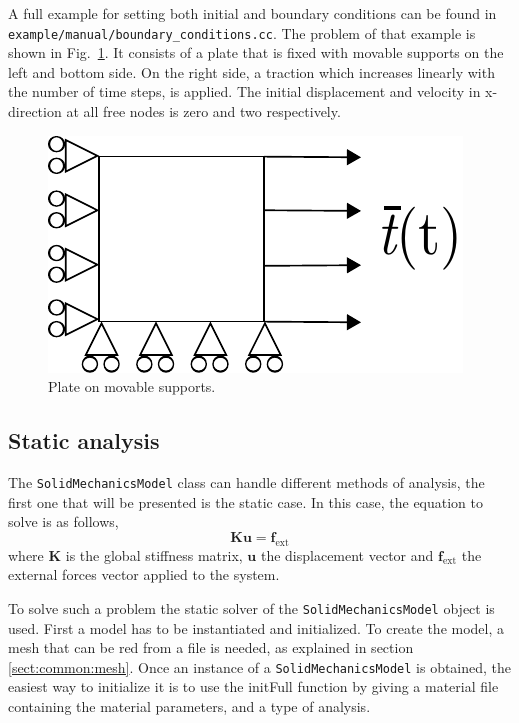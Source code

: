 \documentclass[a4paper,11pt]{book}
\newcommand{\code}[1]{\texttt{#1}}
\renewcommand{\vec}[1]{\ensuremath{\boldsymbol{#1}}}
\newcommand{\mat}[1]{\ensuremath{\boldsymbol{#1}}}
\newcommand{\st}[1]{{\mathrm{#1}}}
\begin{document}
A full example for setting both initial and boundary conditions can be found in \code{example/manual/boundary\_conditions.cc}. The problem of that example is shown in Fig.~\ref{fig:smm:bc_and_ic}. It consists of a plate that is fixed with movable supports on the left and bottom side. On the right side, a traction which increases linearly with the number of time steps, is applied. The initial displacement and velocity in x-direction at all free nodes is zero and two respectively.
\begin{figure}[!htb]
  \centering
  \includegraphics[scale=0.8]{figures/bc_and_ic_example}
  \caption{Plate on movable supports.\label{fig:smm:bc_and_ic}}
\end{figure}

\subsection{Static analysis\label{sect:smm:static}}

The \code{SolidMechanicsModel}  class can handle different  methods of analysis,
the first  one that will  be presented  is the static  case.  In this  case, the
equation to solve is as follows,
\begin{equation}\label{eqn:smm:static}
  \mat{K} \vec{u} = \vec{f_{\st{ext}}}
\end{equation}
where  $\mat{K}$ is  the  global stiffness  matrix,  $\vec{u}$ the  displacement
vector  and  $\vec{f_{\st{ext}}}$ the  external  forces  vector  applied to  the
system.


To     solve    such     a    problem     the    static     solver     of    the
\code{SolidMechanicsModel}  object is used.   First a
model has to be instantiated and  initialized.  To create the model, a mesh that
can   be   red   from   a   file   is   needed,   as   explained   in   section
\ref{sect:common:mesh}.   Once an  instance of  a  \code{SolidMechanicsModel} is
obtained,   the    easiest   way    to   initialize   it    is   to    use   the
initFull function by  giving a material file
containing the material parameters, and a type of analysis.
\end{document}
